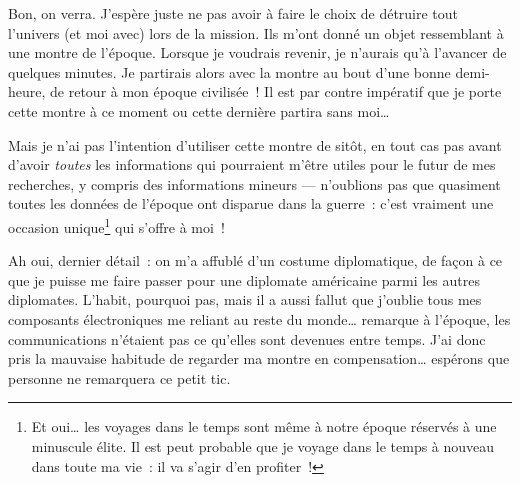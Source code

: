 {	Bon, on verra.  J’espère juste ne pas avoir à faire le choix de détruire tout l’univers (et moi avec) lors de la mission.
	Ils m’ont donné un objet ressemblant à une montre de l’époque.  Lorsque je voudrais revenir, je n’aurais qu’à l’avancer de quelques minutes.
	Je partirais alors avec la montre au bout d’une bonne demi-heure, de retour à mon époque civilisée~!
	Il est par contre impératif que je porte cette montre à ce moment ou cette dernière partira sans moi…

	Mais je n’ai pas l’intention d’utiliser cette montre de sitôt, en tout cas pas avant d’avoir \emph{toutes} les informations qui pourraient m’être utiles pour le futur de mes recherches, y compris des informations mineurs — n’oublions pas que quasiment toutes les données de l’époque ont disparue dans la guerre~:  c’est vraiment une occasion unique\footnote{Et oui… les voyages dans le temps sont même à notre époque réservés à une minuscule élite.  Il est peut probable que je voyage dans le temps à nouveau dans toute ma vie~:  il va s’agir d’en profiter~!} qui s’offre à moi~!

	Ah oui, dernier détail~:  on m’a affublé d’un costume diplomatique, de façon à ce que je puisse me faire passer pour une diplomate américaine parmi les autres diplomates.
	L’habit, pourquoi pas, mais il a aussi fallut que j’oublie tous mes composants électroniques me reliant au reste du monde… remarque à l’époque, les communications n’étaient pas ce qu’elles sont devenues entre temps.
	J’ai donc pris la mauvaise habitude de regarder ma montre en compensation… espérons que personne ne remarquera ce petit tic.
}

